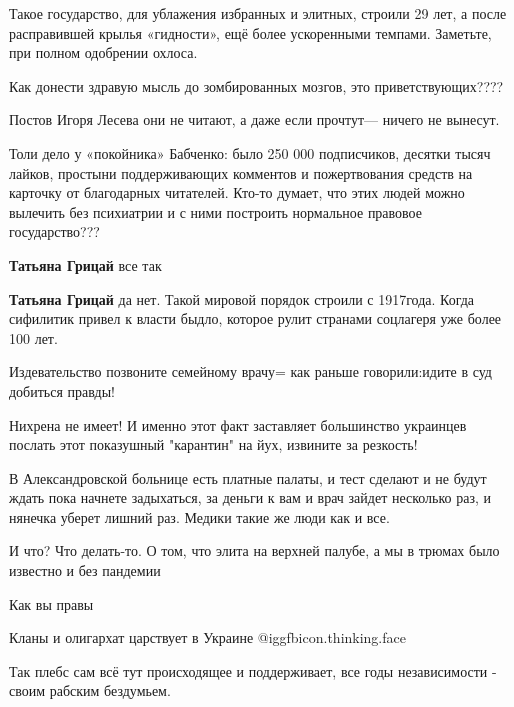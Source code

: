 \begin{itemize}
\begin{itemize}
\end{itemize} %


Такое государство, для ублажения избранных и элитных, строили 29 лет, а после
расправившей крылья «гидности», ещё более ускоренными темпами. Заметьте, при
полном одобрении охлоса.

Как донести здравую мысль до зомбированных мозгов, это приветствующих????

Постов Игоря Лесева они не читают, а даже если прочтут— ничего не вынесут.

Толи дело у «покойника» Бабченко: было 250 000 подписчиков, десятки тысяч
лайков, простыни поддерживающих комментов и пожертвования средств на карточку
от благодарных читателей. Кто-то думает, что этих людей можно вылечить без
психиатрии и с ними построить нормальное правовое государство???

\begin{itemize} %
\textbf{Татьяна Грицай} все так

\textbf{Татьяна Грицай} да нет. Такой мировой порядок строили с 1917года. Когда сифилитик привел к власти быдло, которое рулит странами соцлагеря уже более 100 лет.
\end{itemize} %

Издевательство позвоните семейному врачу= как раньше говорили:идите в суд добиться правды!

Нихрена не имеет! И именно этот факт заставляет большинство украинцев послать этот показушный "карантин" на йух, извините за резкость!


В Александровской больнице есть платные палаты, и тест сделают и не будут ждать
пока начнете задыхаться, за деньги к вам и врач зайдет несколько раз, и нянечка
уберет лишний раз. Медики такие же люди как и все.

И что? Что делать-то. О том, что элита на верхней палубе, а мы в трюмах было известно и без пандемии

Как вы правы

Кланы и олигархат царствует в Украине  @igg{fbicon.thinking.face} 

Так плебс сам всё тут происходящее и поддерживает, все годы независимости - своим рабским бездумьем.


\end{itemize}

